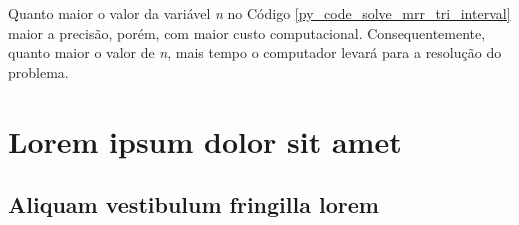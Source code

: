 \documentclass[
	12pt,				%
	openright,			%
    twoside,			%
	a4paper,			%
	english,			%
	french,				%
	spanish,			%
	brazil				%
	]{abntex2}
\numberwithin{lema}{chapter}
\numberwithin{teorema}{chapter}
\numberwithin{definicao}{chapter}
\numberwithin{exemplo}{chapter}
\numberwithin{figure}{chapter}
\begin{document}
Quanto maior o valor da variável \textit{n} no Código \ref{py_code_solve_mrr_tri_interval} maior a precisão, porém, com maior custo computacional. Consequentemente, quanto maior o valor de \textit{n}, mais tempo o computador levará para a resolução do problema.


%


\iffalse
\chapter{Lorem ipsum dolor sit amet}

\section{Aliquam vestibulum fringilla lorem}

\lipsum[1]

\lipsum[2-3]

\lipsum[1]

\lipsum[2-3]

\lipsum[1]

\lipsum[2-3]

\lipsum[1]

\lipsum[2-3]

\lipsum[1]

\lipsum[2-3]

\lipsum[1]

\lipsum[2-3]

\end{document}
